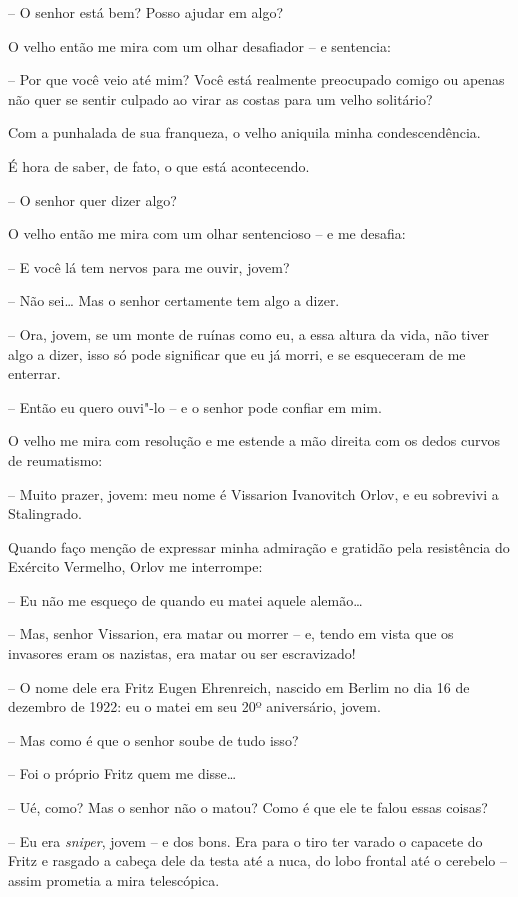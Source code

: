 -- O senhor está bem? Posso ajudar em algo?

O velho então me mira com um olhar desafiador -- e sentencia:

-- Por que você veio até mim? Você está realmente preocupado comigo ou
apenas não quer se sentir culpado ao virar as costas para um velho
solitário?

Com a punhalada de sua franqueza, o velho aniquila minha
condescendência.

É hora de saber, de fato, o que está acontecendo.

-- O senhor quer dizer algo?

O velho então me mira com um olhar sentencioso -- e me desafia:

-- E você lá tem nervos para me ouvir, jovem?

-- Não sei\ldots{} Mas o senhor certamente tem algo a dizer.

-- Ora, jovem, se um monte de ruínas como eu, a essa altura da vida, não
tiver algo a dizer, isso só pode significar que eu já morri, e se
esqueceram de me enterrar.

-- Então eu quero ouvi"-lo -- e o senhor pode confiar em mim.

O velho me mira com resolução e me estende a mão direita com os dedos
curvos de reumatismo:

-- Muito prazer, jovem: meu nome é Vissarion Ivanovitch Orlov, e eu
sobrevivi a Stalingrado.

Quando faço menção de expressar minha admiração e gratidão pela
resistência do Exército Vermelho, Orlov me interrompe:

-- Eu não me esqueço de quando eu matei aquele alemão\ldots{}

-- Mas, senhor Vissarion, era matar ou morrer -- e, tendo em vista que
os invasores eram os nazistas, era matar ou ser escravizado!

-- O nome dele era Fritz Eugen Ehrenreich, nascido em Berlim no dia 16
de dezembro de 1922: eu o matei em seu 20º aniversário, jovem.

-- Mas como é que o senhor soube de tudo isso?

-- Foi o próprio Fritz quem me disse\ldots{}

-- Ué, como? Mas o senhor não o matou? Como é que ele te falou essas
coisas?

-- Eu era \emph{sniper}, jovem -- e dos bons. Era para o tiro ter varado
o capacete do Fritz e rasgado a cabeça dele da testa até a nuca, do lobo
frontal até o cerebelo -- assim prometia a mira telescópica.

